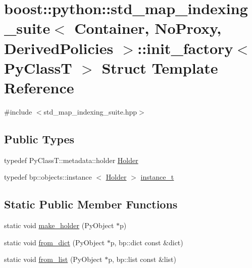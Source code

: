 \hypertarget{structboost_1_1python_1_1std__map__indexing__suite_1_1init__factory}{\section{boost\-:\-:python\-:\-:std\-\_\-map\-\_\-indexing\-\_\-suite$<$ \-Container, \-No\-Proxy, \-Derived\-Policies $>$\-:\-:init\-\_\-factory$<$ \-Py\-Class\-T $>$ \-Struct \-Template \-Reference}
\label{structboost_1_1python_1_1std__map__indexing__suite_1_1init__factory}
}


{\ttfamily \#include $<$std\-\_\-map\-\_\-indexing\-\_\-suite.\-hpp$>$}

\subsection*{\-Public \-Types}
\begin{DoxyCompactItemize}
\item 
typedef \-Py\-Class\-T\-::metadata\-::holder \hyperlink{structboost_1_1python_1_1std__map__indexing__suite_1_1init__factory_a785b4c017210dd048b47eb6c04a5cdc6}{\-Holder}
\item 
typedef bp\-::objects\-::instance\*
$<$ \hyperlink{structboost_1_1python_1_1std__map__indexing__suite_1_1init__factory_a785b4c017210dd048b47eb6c04a5cdc6}{\-Holder} $>$ \hyperlink{structboost_1_1python_1_1std__map__indexing__suite_1_1init__factory_aea2971d45c2f4de6ac83494b504d9a19}{instance\-\_\-t}
\end{DoxyCompactItemize}
\subsection*{\-Static \-Public \-Member \-Functions}
\begin{DoxyCompactItemize}
\item 
static void \hyperlink{structboost_1_1python_1_1std__map__indexing__suite_1_1init__factory_acd1c1789efbbb4f595abae51b1f0a2a0}{make\-\_\-holder} (\-Py\-Object $\ast$p)
\item 
static void \hyperlink{structboost_1_1python_1_1std__map__indexing__suite_1_1init__factory_aa1f0944f15cb284c240d25bfa6f0ccca}{from\-\_\-dict} (\-Py\-Object $\ast$p, bp\-::dict const \&dict)
\item 
static void \hyperlink{structboost_1_1python_1_1std__map__indexing__suite_1_1init__factory_ad0dbf8e2c1b8fa7dd7ecf87415e7d3fb}{from\-\_\-list} (\-Py\-Object $\ast$p, bp\-::list const \&list)
\end{DoxyCompactItemize}
